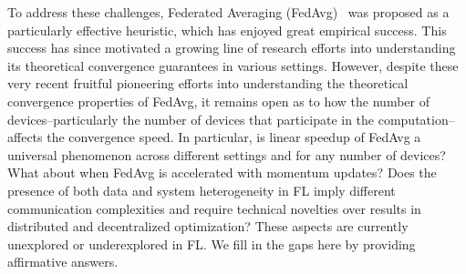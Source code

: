 To address these challenges, Federated Averaging (FedAvg)~\cite{mcmahan2016communication} was proposed as a particularly effective heuristic, which has enjoyed great empirical success. This success has since motivated a growing line of research efforts \cite{haddadpour2019convergence,li2019convergence,karimireddy2019scaffold,huo2020faster} into understanding its theoretical convergence guarantees in various settings. 
However, despite these very recent fruitful pioneering efforts into understanding the theoretical convergence properties of FedAvg, it remains open as to how the number of devices--particularly the number of devices that participate in the computation--affects the convergence speed.
In particular, is linear speedup of FedAvg a universal phenomenon across different settings and for any number of devices? What about when FedAvg is accelerated with momentum updates? Does the presence of both data and system heterogeneity in FL imply different communication complexities and require technical novelties over results in distributed and decentralized optimization? These aspects are currently unexplored or underexplored in FL. We fill in the gaps here by providing affirmative answers.

